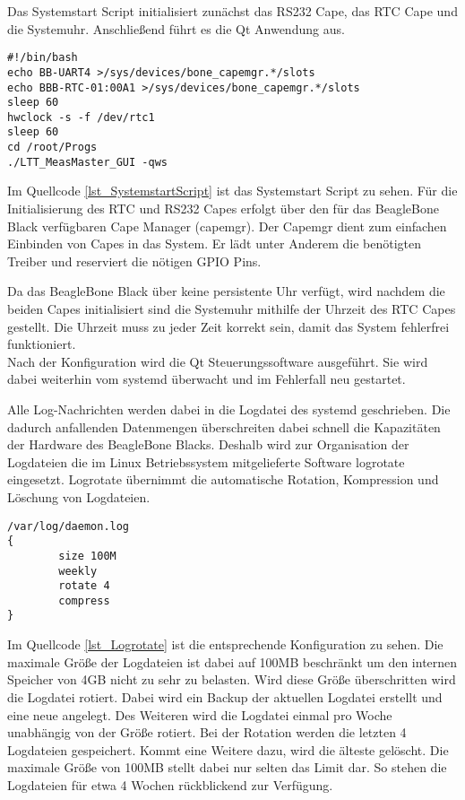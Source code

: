 Das Systemstart Script initialisiert zunächst das RS232 Cape, das \ac{RTC} Cape und die Systemuhr. Anschließend führt es die Qt Anwendung aus.\\ 

\begin{lstlisting}[caption={Systemstart Script},label=lst_SystemstartScript]
#!/bin/bash
echo BB-UART4 >/sys/devices/bone_capemgr.*/slots
echo BBB-RTC-01:00A1 >/sys/devices/bone_capemgr.*/slots
sleep 60
hwclock -s -f /dev/rtc1
sleep 60
cd /root/Progs
./LTT_MeasMaster_GUI -qws
\end{lstlisting}

Im Quellcode \ref{lst_SystemstartScript} ist das Systemstart Script zu sehen. Für die Initialisierung des RTC und RS232 Capes erfolgt über den für das BeagleBone Black verfügbaren Cape Manager (capemgr). Der Capemgr \cite{Capemgr} dient zum einfachen Einbinden von Capes in das System. Er lädt unter Anderem die benötigten Treiber und reserviert die nötigen \ac{GPIO} Pins.\ 

Da das BeagleBone Black über keine persistente Uhr verfügt, wird nachdem die beiden Capes initialisiert sind die Systemuhr mithilfe der Uhrzeit des RTC Capes gestellt. Die Uhrzeit muss zu jeder Zeit korrekt sein, damit das System fehlerfrei funktioniert.\\
Nach der Konfiguration wird die Qt Steuerungssoftware ausgeführt. Sie wird dabei weiterhin vom systemd überwacht und im Fehlerfall neu gestartet.\ 

Alle Log-Nachrichten werden dabei in die Logdatei des systemd geschrieben. Die dadurch anfallenden Datenmengen überschreiten dabei schnell die Kapazitäten der Hardware des BeagleBone Blacks. Deshalb wird zur Organisation der Logdateien die im Linux Betriebssystem mitgelieferte Software logrotate \citep{logrotate} eingesetzt. Logrotate übernimmt die automatische Rotation, Kompression und Löschung von Logdateien. 



\begin{lstlisting}[caption={Logrotate},label=lst_Logrotate]
/var/log/daemon.log
{
        size 100M
        weekly
        rotate 4
        compress
}
\end{lstlisting}

Im Quellcode \ref{lst_Logrotate} ist die entsprechende Konfiguration zu sehen. Die maximale Größe der Logdateien ist dabei auf 100MB beschränkt um den internen Speicher von 4GB nicht zu sehr zu belasten. Wird diese Größe überschritten wird die Logdatei rotiert. Dabei wird ein Backup der aktuellen Logdatei erstellt und eine neue angelegt. Des Weiteren wird die Logdatei einmal pro Woche unabhängig von der Größe rotiert. Bei der Rotation werden die letzten 4 Logdateien gespeichert. Kommt eine Weitere dazu, wird die älteste gelöscht. Die maximale Größe von 100MB stellt dabei nur selten das Limit dar. So stehen die Logdateien für etwa 4 Wochen rückblickend zur Verfügung.






